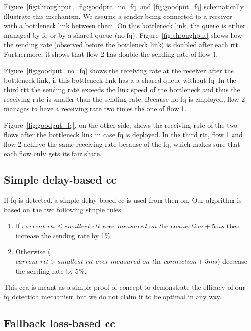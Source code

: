 \documentclass[runningheads]{llncs}
\newcommand{\mynote}[3]{
    \fbox{\bfseries\sffamily\scriptsize#1}
    {\small$\blacktriangleright$\textsf{\emph{\color{#3}{#2}}}$\blacktriangleleft$}}
\newcommand{\noteMax}[1]{\mynote{Max}{#1}{green}}
\begin{document}
Figure~\ref{fig:throughput}, \ref{fig:goodput_no_fq} and \ref{fig:goodput_fq} schematically illustrate this mechanism. We assume a sender being connected to a receiver, with a bottleneck link between them. On this bottleneck link, the queue is either managed by \gls{fq} or by a shared queue (no \gls{fq}). Figure~\ref{fig:throughput} shows how the sending rate (observed before the bottleneck link) is doubled after each \gls{rtt}. Furthermore, it shows that flow 2 has double the sending rate of flow 1. %

Figure~\ref{fig:goodput_no_fq} shows the receiving rate at the receiver after the bottleneck link, if this bottleneck link has a a shared queue without \gls{fq}. In the third \gls{rtt} the sending rate exceeds the link speed of the bottleneck and thus the receiving rate is smaller than the sending rate. Because no \gls{fq} is employed, flow 2 manages to have a receiving rate two times the one of flow 1. 

Figure~\ref{fig:goodput_fq}, on the other side, shows the receiving rate of the two flows after the bottleneck link in case \gls{fq} is deployed. In the third \gls{rtt}, flow 1 and flow 2 achieve the same receiving rate because of the \gls{fq}, which makes sure that each flow only gets its fair share. 

\subsection{Simple delay-based \gls{cc}}

If \gls{fq} is detected, a simple delay-based \gls{cc} is used from then on. Our algorithm is based on the two following simple rules:
\begin{enumerate}
\item If $\textit{current rtt} \leq \textit{smallest rtt ever measured on the connection} + 5\textit{ms}$ then increase the sending rate by 1\%.
\item Otherwise ($\textit{current rtt} > \textit{smallest rtt ever measured on the connection} + 5\textit{ms}$) decrease the sending rate by 5\%.
\end{enumerate}

This \gls{cca} is meant as a simple proof-of-concept to demonstrate the efficacy of our \gls{fq} detection mechanism but we do not claim it to be optimal in any way. 

\subsection{Fallback loss-based \gls{cc}}
\end{document}
